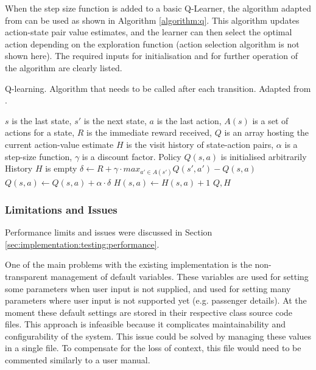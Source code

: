 When the step size function is added to a basic Q-Learner, the algorithm
adapted from \textcite{Sutton1998ai+reinforcement} can be used as shown in
Algorithm \ref{algorithm:q}. This algorithm updates action-state pair value
estimates, and the learner can then select the optimal action depending on the
exploration function (action selection algorithm is not shown here). The
required inputs for initialisation and for further operation of the algorithm
are clearly listed.

\begin{algorithm}
  \caption{
  Q-learning. Algorithm that needs to be called after each transition. 
  Adapted from \textcite{Sutton1998ai+reinforcement}. 
  \label{algorithm:q}}

  \begin{algorithmic}[1]
    \Require
      \Statex $s$ is the last state,
      \Statex $s'$ is the next state,
      \Statex $a$ is the last action,
      \Statex $A(s)$ is a set of actions for a state,
      \Statex $R$ is the immediate reward received,
      \Statex $Q$ is an array hosting the current action-value estimate
      \Statex $H$ is the visit history of state-action pairs,
      \Statex $\alpha$ is a step-size function,
      \Statex $\gamma$ is a discount factor.
      \Statex Policy $Q(s, a)$ is initialised arbitrarily
      \Statex History $H$ is empty
      \State $\delta \gets R + 
              \gamma \cdot max_{a' \in A(s')} Q(s', a') - Q(s, a)$
      \State $Q(s, a) \gets Q(s, a) + \alpha \cdot \delta$
      \State $H(s, a) \gets H(s, a) + 1$
      \State \Return $Q, H$
    \EndFunction
  \end{algorithmic}
\end{algorithm}


\subsubsection{Limitations and Issues}
\label{sec:implementation:software:issues}

Performance limits and issues were discussed in Section
\ref{sec:implementation:testing:performance}.

One of the main problems with the existing implementation is the non-
transparent management of default variables. These variables are used for
setting some parameters when user input is not supplied, and used for setting
many parameters where user input is not supported yet (e.g. passenger details).
At the moment these default settings are stored in their respective class
source code files. This approach is infeasible because it complicates
maintainability and configurability of the system. This issue could be solved
by managing these values in a single file. To compensate for the loss of
context, this file would need to be commented similarly to a user manual.

